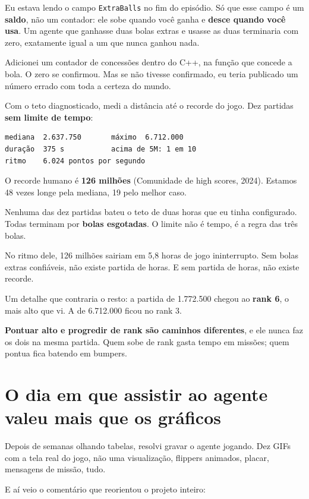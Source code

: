 \documentclass[10pt,a4paper,twoside,twocolumn]{scrartcl}
\let\oldtexttt\texttt
\renewcommand{\texttt}[1]{{\small\oldtexttt{#1}}}
\begin{document}
Eu estava lendo o campo \texttt{ExtraBalls} no fim do episódio. Só que
esse campo é um \textbf{saldo}, não um contador: ele sobe quando você
ganha e \textbf{desce quando você usa}. Um agente que ganhasse duas
bolas extras e usasse as duas terminaria com zero, exatamente igual a um
que nunca ganhou nada.

Adicionei um contador de concessões dentro do C++, na função que concede
a bola. O zero se confirmou. Mas se não tivesse confirmado, eu teria
publicado um número errado com toda a certeza do mundo.

Com o teto diagnosticado, medi a distância até o recorde do jogo. Dez
partidas \textbf{sem limite de tempo}:

\begin{verbatim}
mediana  2.637.750       máximo  6.712.000
duração  375 s           acima de 5M: 1 em 10
ritmo    6.024 pontos por segundo
\end{verbatim}

O recorde humano é \textbf{126 milhões} (Comunidade de high scores,
2024). Estamos 48 vezes longe pela mediana, 19 pelo melhor caso.

Nenhuma das dez partidas bateu o teto de duas horas que eu tinha
configurado. Todas terminam por \textbf{bolas esgotadas}. O limite não é
tempo, é a regra das três bolas.

No ritmo dele, 126 milhões sairiam em 5,8 horas de jogo ininterrupto.
Sem bolas extras confiáveis, não existe partida de horas. E sem partida
de horas, não existe recorde.

Um detalhe que contraria o resto: a partida de 1.772.500 chegou ao
\textbf{rank 6}, o mais alto que vi. A de 6.712.000 ficou no rank 3.

\textbf{Pontuar alto e progredir de rank são caminhos diferentes}, e ele
nunca faz os dois na mesma partida. Quem sobe de rank gasta tempo em
missões; quem pontua fica batendo em bumpers.

\section{O dia em que assistir ao agente valeu mais que os
gráficos}\label{o-dia-em-que-assistir-ao-agente-valeu-mais-que-os-gruxe1ficos}

Depois de semanas olhando tabelas, resolvi gravar o agente jogando. Dez
GIFs com a tela real do jogo, não uma visualização, flippers animados,
placar, mensagens de missão, tudo.

E aí veio o comentário que reorientou o projeto inteiro:
\end{document}
